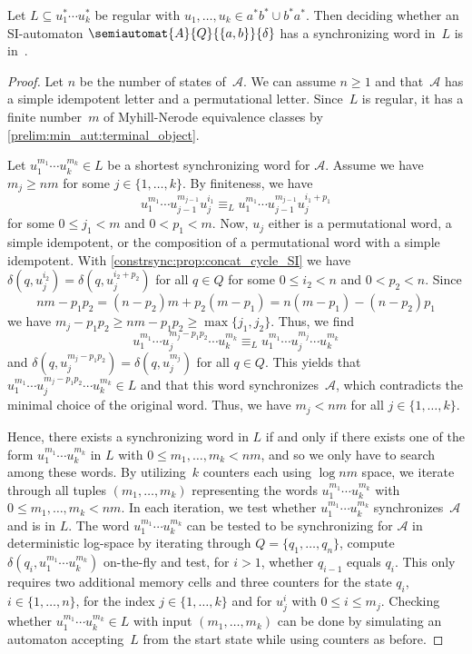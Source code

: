 \begin{proposition} \label{constrsync:prop:SI:boundedLcase}
	Let $L \subseteq u_1^* \cdots u_k^*$
	be regular with $u_1, \ldots, u_k \in a^* b^* \cup b^* a^*$.
	Then deciding whether an SI-automaton $\semiautomat{A}{Q}{\{a,b\}}{\delta}$ 
	has a synchronizing word in~$L$	is in~\LOGSPACE.
\end{proposition}
\begin{proof}
	Let $n$ be the number of states of~$\mathcal A$.
	We can assume $n \ge 1$ and that~$\mathcal A$ has 
	a simple idempotent letter and a permutational letter.	
	Since~$L$ is regular, it has a finite number~$m$ of Myhill-Nerode equivalence
	classes by \cref{prelim:min_aut:terminal_object}.
	
	Let $u_1^{m_1} \cdots u_k^{m_k} \in L$ be a shortest
	synchronizing word for $\mathcal A$.	
	Assume we have $m_j \ge nm$ for some $j \in \{1,\ldots,k\}$.
	By finiteness, we have
	\[
	u_1^{m_1} \cdots u_{j-1}^{m_{j-1}} u_j^{i_1} \equiv_{L} 
	u_1^{m_1} \cdots u_{j-1}^{m_{j-1}} u_j^{i_1 + p_1}
	\]
	for some $0 \le j_1 < m$ and $0 < p_1 < m$.
	Now, $u_j$ either is a permutational word, a simple idempotent,
	or the composition of a permutational word with a simple idempotent.
	With \cref{constrsync:prop:concat_cycle_SI} 
	we have $\delta(q, u_j^{i_2}) = \delta(q, u_j^{i_2 + p_2})$
	for all $q \in Q$ for some $0 \le i_2 < n$
	and $0 < p_2 < n$.
	Since 
	\[
	nm - p_1 p_2 = (n- p_2) m + p_2(m - p_1) = n ( m - p_1 ) - (n - p_2) p_1
	\]
	we have $m_j - p_1 p_2 \ge nm - p_1 p_2 \ge \max\{ j_1, j_2 \}$.
	Thus, we find
	\[
	u_1^{m_1} \cdots u_j^{m_j - p_1 p_2} \cdots u_k^{m_k} \equiv_L 
	u_1^{m_1} \cdots u_j^{m_j} \cdots u_k^{m_k}
	\]
	and $\delta(q, u_j^{m_j - p_1 p_2}) = \delta(q, u_j^{m_j})$
	for all $q \in Q$.
	This yields that $u_1^{m_1} \cdots u_j^{m_j - p_1 p_2} \cdots u_k^{m_k} \in L$
	and that this word synchronizes~$\mathcal A$,
	which contradicts the minimal choice of the original word.
	Thus, we have $m_j < nm$ for all $j \in \{1,\ldots,k\}$.
		
	Hence, there exists a synchronizing word in $L$ if and only if there exists one of the form $u_1^{m_1} \cdots u_k^{m_k}$ in $L$
	with $0 \le m_1, \ldots, m_k < nm$, and so we only have to search among these words.
	By utilizing~$k$ counters each 
	using $\log nm$ space,
	we iterate through all tuples $(m_1, \ldots, m_k)$
	representing the words $u_1^{m_1} \cdots u_k^{m_k}$
	with $0 \le m_1, \ldots, m_k < nm$.
	In each iteration, we test whether  $u_1^{m_1} \cdots u_k^{m_k}$
	synchronizes~$\mathcal A$ and is in $L$.
	The word $u_1^{m_1} \cdots u_k^{m_k}$
	can be tested to be synchronizing for $\mathcal A$ in deterministic log-space
	by iterating through $Q = \{q_1, \ldots, q_n\}$,
	compute $\delta(q_i, u_1^{m_1} \cdots u_k^{m_k})$ on-the-fly
	and test, for $i > 1$, whether $q_{i-1}$ equals $q_i$.
	This only requires two additional memory cells and three counters for 
	the state $q_i$, $i \in \{1,\ldots,n\}$, for the index $j \in \{1,\ldots,k\}$
	and for $u_j^{i}$ with $0 \le i \le m_j$.
	Checking whether $u_1^{m_1} \cdots u_k^{m_k} \in L$
	with input $(m_1, \ldots, m_k)$ can be done
	by simulating an automaton accepting~$L$ from the start state while using
	counters as before.
\end{proof} 

